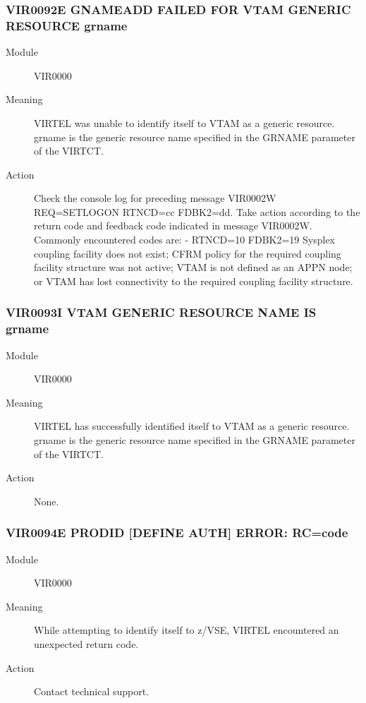 \documentclass[letterpaper,10pt,english]{sphinxmanual}
\begin{document}
\subsubsection{VIR0092E GNAMEADD FAILED FOR VTAM GENERIC RESOURCE grname}
\label{\detokenize{messages:vir0092e-gnameadd-failed-for-vtam-generic-resource-grname}}\begin{description}
\item[{Module}] \leavevmode
VIR0000

\item[{Meaning}] \leavevmode
VIRTEL was unable to identify itself to VTAM as a generic resource. grname is the generic resource name specified in the GRNAME parameter of the VIRTCT.

\item[{Action}] \leavevmode
Check the console log for preceding message VIR0002W REQ=SETLOGON RTNCD=cc FDBK2=dd. Take action according to the return code and feedback code indicated in message VIR0002W. Commonly encountered codes are:
- RTNCD=10 FDBK2=19 Sysplex coupling facility does not exist; CFRM policy for the required coupling facility structure was not active; VTAM is not defined as an APPN node; or VTAM has lost connectivity to the required coupling facility structure.

\end{description}


\subsubsection{VIR0093I VTAM GENERIC RESOURCE NAME IS grname}
\label{\detokenize{messages:vir0093i-vtam-generic-resource-name-is-grname}}\begin{description}
\item[{Module}] \leavevmode
VIR0000

\item[{Meaning}] \leavevmode
VIRTEL has successfully identified itself to VTAM as a generic resource. grname is the generic resource name specified in the GRNAME parameter of the VIRTCT.

\item[{Action}] \leavevmode
None.

\end{description}


\subsubsection{VIR0094E PRODID {[}DEFINE \textbar{} AUTH{]} ERROR: RC=code}
\label{\detokenize{messages:vir0094e-prodid-define-auth-error-rc-code}}\begin{description}
\item[{Module}] \leavevmode
VIR0000

\item[{Meaning}] \leavevmode
While attempting to identify itself to z/VSE, VIRTEL encountered an unexpected return code.

\item[{Action}] \leavevmode
Contact technical support.

\end{description}
\end{document}
